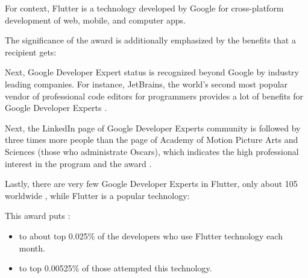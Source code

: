 For context, Flutter is a technology developed by Google for cross-platform development of web, mobile, and computer apps.

The significance of the award is additionally emphasized by the benefits that a recipient gets:


Next, Google Developer Expert status is recognized beyond Google by industry leading companies.
For instance, JetBrains, the world's second most popular vendor of professional
code editors for programmers provides a lot of benefits for Google Developer Experts
.

Next, the LinkedIn page of Google Developer Experts community is followed by
three times more people than the page of Academy of Motion Picture Arts and Sciences
(those who administrate Oscars), which indicates the high professional interest
in the program and the award .

Lastly, there are very few Google Developer Experts in Flutter, only about 105 worldwide
, while Flutter is a popular technology:


This award puts \mrl:

\begin{itemize}
    \item to about top 0.025\% of the developers who use Flutter technology each month.
    \item to top 0.00525\% of those attempted this technology.
\end{itemize}

